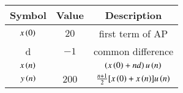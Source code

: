 \begin{tabular}{|c|c|c|}
   \hline
   \textbf{Symbol} & \textbf{Value}& \textbf{Description} \\
   \hline
        $ x\left(0\right)$ & $20$ & first term of AP\\
        \hline
        d & ${-1}$ & common difference\\
        \hline
        $x\left(n\right)$ &  & $\left(x\left(0\right)+nd\right)u\left(n\right)$\\
        \hline
        $y\left(n\right)$ & $200$ & $\frac{n+1}{2}[x\left(0\right)+x\left(n\right)]u\left(n\right)$\\
        \hline
\end{tabular}
